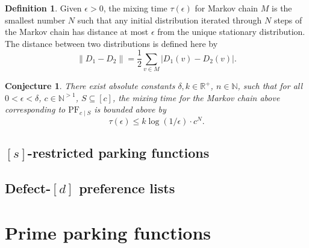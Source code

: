 \documentclass[12 pt]{amsart}
\newtheorem{conjecture}[theorem]{Conjecture}
\theoremstyle{definition} %
\newtheorem{definition}[theorem]{Definition}
\theoremstyle{remark} %
\begin{document}
\begin{definition}
    Given $\epsilon>0$, the mixing time $\tau(\epsilon)$ for Markov chain $M$ is the smallest number $N$ such that any initial distribution iterated through $N$ steps of the Markov chain has distance at most $\epsilon$ from the unique stationary distribution. The distance between two distributions is defined here by \[\|D_1-D_2\|=\frac{1}{2}\sum_{v\in M}|D_1(v)-D_2(v)|.\]
\end{definition}

\begin{conjecture}
    There exist absolute constants $\delta, k\in\mathbb{R}^+$, $n\in\mathbb{N}$, such that for all $0<\epsilon<\delta$, $c\in\mathbb{N}^{>1}$, $S\subseteq [c]$, the mixing time for the Markov chain above corresponding to $\mathrm{PF}_{c\mid S}$ is bounded above by \[\tau(\epsilon)\le k\log(1/\epsilon)\cdot c^N.\]
\end{conjecture}


\subsection{\texorpdfstring{$[s]$-restricted parking functions}{Initial segment restrictions}}


\subsection{\texorpdfstring{Defect-$[d]$ preference lists}{Defective preference lists}}

\appendix

\section{Prime parking functions} \label{a:prime}

\primebreak*
\end{document}

